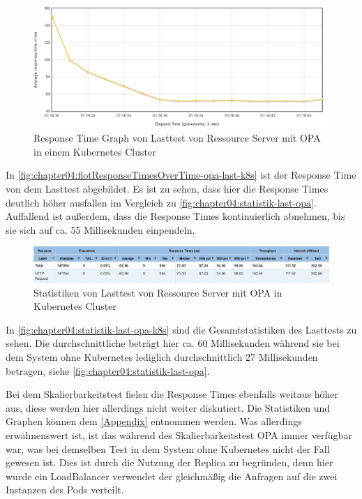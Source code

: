\begin{figure}[H]
  \centering
  \includegraphics[width=1.0\textwidth]{gfx/flotResponseTimesOverTime-opa-last-k8s.png}
  \caption{Response Time Graph von Lasttest von Ressource Server mit OPA in einem Kubernetes Cluster}
  \label{fig:chapter04:flotResponseTimesOverTime-opa-last-k8s}
\end{figure}

In \autoref{fig:chapter04:flotResponseTimesOverTime-opa-last-k8s} ist der Response Time von dem Lasttest abgebildet. Es ist zu sehen, dass hier die Response Times deutlich höher ausfallen im Vergleich zu \autoref{fig:chapter04:statistik-last-opa}. Auffallend ist außerdem, dass die Response Times kontinuierlich abnehmen, bis sie sich auf ca. 55 Millisekunden einpendeln. 

\begin{figure}[H]
  \centering
  \includegraphics[width=1.0\textwidth]{gfx/statistik-last-opa-k8s.png}
  \caption{Statistiken von Lasttest von Ressource Server mit OPA in Kubernetes Cluster}
  \label{fig:chapter04:statistik-last-opa-k8s}
\end{figure}

In \autoref{fig:chapter04:statistik-last-opa-k8s} sind die Gesamtstatistiken des Lasttests zu sehen. Die durchschnittliche beträgt hier ca. 60 Millisekunden während sie bei dem System ohne Kubernetes lediglich durchschnittlich 27 Millisekunden betragen, siehe \autoref{fig:chapter04:statistik-last-opa}.\smallskip

Bei dem Skalierbarkeitstest fielen die Response Times ebenfalls weitaus höher aus, diese werden hier allerdings nicht weiter diskutiert. Die Statistiken und Graphen können dem \autoref{Appendix} entnommen werden. Was allerdings erwähnenswert ist, ist das während des Skalierbarkeitstest OPA immer verfügbar war, was bei demselben Test in dem System ohne Kubernetes nicht der Fall gewesen ist. Dies ist durch die Nutzung der Replica zu begründen, denn hier wurde ein LoadBalancer verwendet der gleichmäßig die Anfragen auf die zwei Instanzen des Pods verteilt. 

